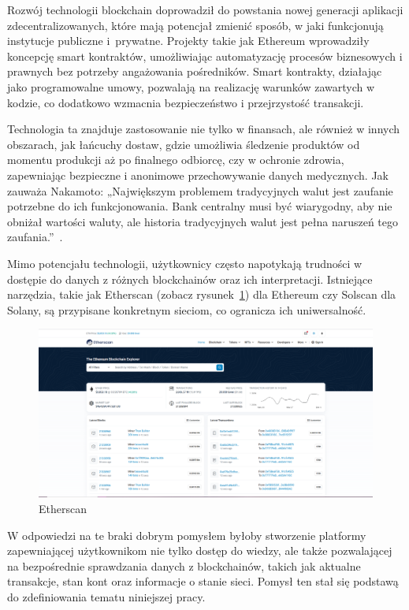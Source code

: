 Rozwój technologii blockchain doprowadził do powstania nowej generacji aplikacji zdecentralizowanych, które mają potencjał zmienić sposób, w jaki funkcjonują instytucje publiczne i~prywatne. Projekty takie jak Ethereum  wprowadziły koncepcję smart kontraktów, umożliwiając automatyzację procesów biznesowych i prawnych bez potrzeby angażowania pośredników. Smart kontrakty, działając jako programowalne umowy, pozwalają na realizację warunków zawartych w kodzie, co dodatkowo wzmacnia bezpieczeństwo i przejrzystość transakcji.

Technologia ta znajduje zastosowanie nie tylko w finansach, ale również w innych obszarach, jak łańcuchy dostaw, gdzie umożliwia śledzenie produktów od momentu produkcji aż po finalnego odbiorcę, czy w ochronie zdrowia, zapewniając bezpieczne i anonimowe przechowywanie danych medycznych. Jak zauważa Nakamoto: „Największym problemem tradycyjnych walut jest zaufanie potrzebne do ich funkcjonowania. Bank centralny musi być wiarygodny, aby nie obniżał wartości waluty, ale historia tradycyjnych walut jest pełna naruszeń tego zaufania.”~\cite{nakamoto_2008}.

Mimo potencjału technologii, użytkownicy często napotykają trudności w dostępie do danych z różnych blockchainów oraz ich interpretacji. Istniejące narzędzia, takie jak Etherscan (zobacz rysunek~\ref{fig:Etherscan}) dla Ethereum czy Solscan dla Solany, są przypisane konkretnym sieciom, co ogranicza ich uniwersalność. 
\begin{figure}[htb]
    \centering
    \includegraphics[width=0.8\linewidth]{./obrazy/Etherscan.png}
    \caption{Etherscan}
    \label{fig:Etherscan}
\end{figure}

W odpowiedzi na te braki dobrym pomysłem byłoby stworzenie platformy zapewniającej użytkownikom nie tylko dostęp do wiedzy, ale także pozwalającej na bezpośrednie sprawdzania danych z blockchainów, takich jak aktualne transakcje, stan kont oraz informacje o stanie sieci. Pomysł ten stał się podstawą do zdefiniowania tematu niniejszej pracy.



